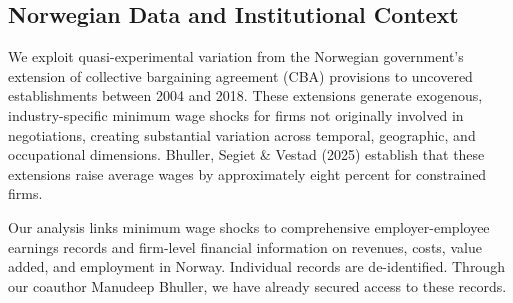 \documentclass[11pt]{article}
\begin{document}

 

\subsection{Norwegian Data and Institutional Context}

We exploit quasi-experimental variation from the Norwegian government's extension of collective bargaining agreement (CBA) provisions to uncovered establishments between 2004 and 2018. These extensions generate exogenous, industry-specific minimum wage shocks for firms not originally involved in negotiations, creating substantial variation across temporal, geographic, and occupational dimensions. Bhuller, Segiet \& Vestad (2025) establish that these extensions raise average wages by approximately eight percent for constrained firms.

Our analysis links minimum wage shocks to comprehensive employer-employee earnings records and firm-level financial information on revenues, costs, value added, and employment in Norway. Individual records are de-identified.  Through our coauthor Manudeep Bhuller, we have already secured access to these records. 
\end{document}
